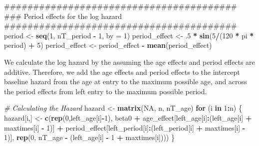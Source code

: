 \documentclass[11pt,]{article}
\newenvironment{Shaded}{\begin{snugshade}}{\end{snugshade}}
\newcommand{\KeywordTok}[1]{\textcolor[rgb]{0.13,0.29,0.53}{\textbf{#1}}}
\newcommand{\DataTypeTok}[1]{\textcolor[rgb]{0.13,0.29,0.53}{#1}}
\newcommand{\DecValTok}[1]{\textcolor[rgb]{0.00,0.00,0.81}{#1}}
\newcommand{\StringTok}[1]{\textcolor[rgb]{0.31,0.60,0.02}{#1}}
\newcommand{\CommentTok}[1]{\textcolor[rgb]{0.56,0.35,0.01}{\textit{#1}}}
\newcommand{\OtherTok}[1]{\textcolor[rgb]{0.56,0.35,0.01}{#1}}
\newcommand{\ControlFlowTok}[1]{\textcolor[rgb]{0.13,0.29,0.53}{\textbf{#1}}}
\newcommand{\OperatorTok}[1]{\textcolor[rgb]{0.81,0.36,0.00}{\textbf{#1}}}
\newcommand{\NormalTok}[1]{#1}
\begin{document}
\begin{Shaded}
\begin{Highlighting}[]
\NormalTok{  ########################################}
\NormalTok{  ### Period effects for the log hazard}
\NormalTok{  ########################################}
\NormalTok{  period <-}\StringTok{ }\KeywordTok{seq}\NormalTok{(}\DecValTok{1}\NormalTok{, nT_period }\OperatorTok{-}\StringTok{ }\DecValTok{1}\NormalTok{, }\DataTypeTok{by =} \DecValTok{1}\NormalTok{)}
\NormalTok{  period_effect <-}\StringTok{ }\NormalTok{.}\DecValTok{5} \OperatorTok{*}\StringTok{ }\KeywordTok{sin}\NormalTok{(}\DecValTok{5}\OperatorTok{/}\NormalTok{(}\DecValTok{120} \OperatorTok{*}\StringTok{ }\NormalTok{pi }\OperatorTok{*}\StringTok{ }\NormalTok{period) }\OperatorTok{+}\StringTok{ }\DecValTok{5}\NormalTok{)}
\NormalTok{  period_effect <-}\StringTok{ }\NormalTok{period_effect }\OperatorTok{-}\StringTok{ }\KeywordTok{mean}\NormalTok{(period_effect)}
\end{Highlighting}
\end{Shaded}

We calculate the log hazard by the assuming the age effects and period
effects are additive. Therefore, we add the age effects and period
effects to the intercept baseline hazard from the age at entry to the
maximum possible age, and across the period effects from left entry to
the maximum possible period.

\begin{Shaded}
\begin{Highlighting}[]
  \CommentTok{# Calculating the Hazard}
\NormalTok{  hazard <-}\StringTok{ }\KeywordTok{matrix}\NormalTok{(}\OtherTok{NA}\NormalTok{, n, nT_age)}
  \ControlFlowTok{for}\NormalTok{ (i }\ControlFlowTok{in} \DecValTok{1}\OperatorTok{:}\NormalTok{n) \{}
\NormalTok{    hazard[i,] <-}\StringTok{ }\KeywordTok{c}\NormalTok{(}\KeywordTok{rep}\NormalTok{(}\DecValTok{0}\NormalTok{,left_age[i]}\OperatorTok{-}\DecValTok{1}\NormalTok{), beta0 }\OperatorTok{+}
\StringTok{                      }\NormalTok{age_effect[left_age[i]}\OperatorTok{:}\NormalTok{(left_age[i] }\OperatorTok{+}\StringTok{ }\NormalTok{maxtimes[i] }\OperatorTok{-}\StringTok{ }\DecValTok{1}\NormalTok{)] }\OperatorTok{+}
\StringTok{                      }\NormalTok{period_effect[left_period[i]}\OperatorTok{:}\NormalTok{(left_period[i] }\OperatorTok{+}\StringTok{ }\NormalTok{maxtimes[i] }\OperatorTok{-}\StringTok{ }\DecValTok{1}\NormalTok{)],}
                      \KeywordTok{rep}\NormalTok{(}\DecValTok{0}\NormalTok{, nT_age }\OperatorTok{-}\StringTok{ }\NormalTok{(left_age[i] }\OperatorTok{-}\StringTok{ }\DecValTok{1} \OperatorTok{+}\StringTok{ }\NormalTok{maxtimes[i])))}
\NormalTok{  \}}
\end{Highlighting}
\end{Shaded}
\end{document}
